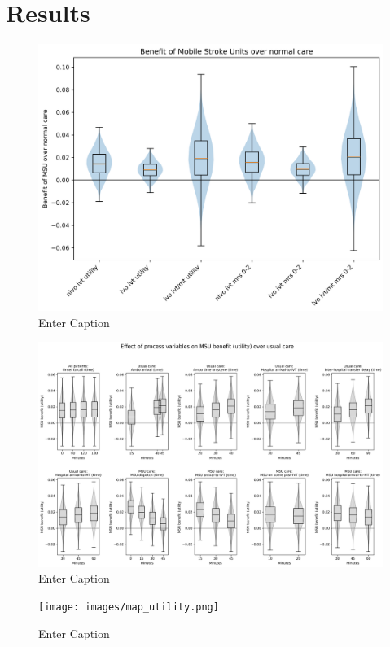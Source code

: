 \section{Results}

\begin{figure}
    \centering
    \includegraphics[width=1\linewidth]{images/scenario_results_summary.png}
    \caption{Enter Caption}
    \label{fig:enter-label}
\end{figure}


\begin{figure}
    \centering
    \includegraphics[width=1\linewidth]{images/msu_net_utility_benefit.png}
    \caption{Enter Caption}
    \label{fig:enter-label}
\end{figure}



\begin{figure}
    \centering
    \texttt{[image: images/map\_utility.png]}
    \caption{Enter Caption}
    \label{fig:enter-label}
\end{figure}
